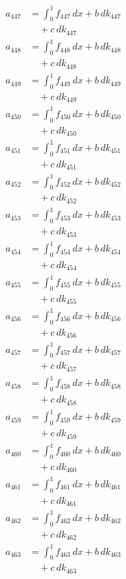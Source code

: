 \documentclass{article}
\begin{document}
\begin{align}
a_{447} &= \int_0^1 f_{447}\,dx + b\,dk_{447} \\
&\quad + c\,dk_{447} \\
a_{448} &= \int_0^1 f_{448}\,dx + b\,dk_{448} \\
&\quad + c\,dk_{448} \\
a_{449} &= \int_0^1 f_{449}\,dx + b\,dk_{449} \\
&\quad + c\,dk_{449} \\
a_{450} &= \int_0^1 f_{450}\,dx + b\,dk_{450} \\
&\quad + c\,dk_{450} \\
a_{451} &= \int_0^1 f_{451}\,dx + b\,dk_{451} \\
&\quad + c\,dk_{451} \\
a_{452} &= \int_0^1 f_{452}\,dx + b\,dk_{452} \\
&\quad + c\,dk_{452} \\
a_{453} &= \int_0^1 f_{453}\,dx + b\,dk_{453} \\
&\quad + c\,dk_{453} \\
a_{454} &= \int_0^1 f_{454}\,dx + b\,dk_{454} \\
&\quad + c\,dk_{454} \\
a_{455} &= \int_0^1 f_{455}\,dx + b\,dk_{455} \\
&\quad + c\,dk_{455} \\
a_{456} &= \int_0^1 f_{456}\,dx + b\,dk_{456} \\
&\quad + c\,dk_{456} \\
a_{457} &= \int_0^1 f_{457}\,dx + b\,dk_{457} \\
&\quad + c\,dk_{457} \\
a_{458} &= \int_0^1 f_{458}\,dx + b\,dk_{458} \\
&\quad + c\,dk_{458} \\
a_{459} &= \int_0^1 f_{459}\,dx + b\,dk_{459} \\
&\quad + c\,dk_{459} \\
a_{460} &= \int_0^1 f_{460}\,dx + b\,dk_{460} \\
&\quad + c\,dk_{460} \\
a_{461} &= \int_0^1 f_{461}\,dx + b\,dk_{461} \\
&\quad + c\,dk_{461} \\
a_{462} &= \int_0^1 f_{462}\,dx + b\,dk_{462} \\
&\quad + c\,dk_{462} \\
a_{463} &= \int_0^1 f_{463}\,dx + b\,dk_{463} \\
&\quad + c\,dk_{463} \\

\end{align}
\end{document}
